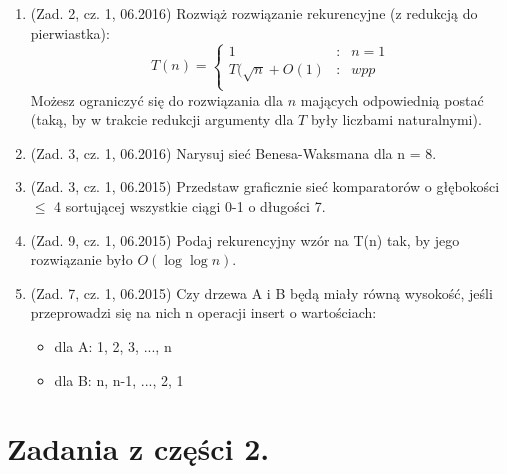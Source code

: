 \documentclass[10pt]{article}%
\begin{document}
\begin{enumerate}


\item (Zad. 2, cz. 1, 06.2016) Rozwiąż rozwiązanie rekurencyjne (z redukcją do pierwiastka):
$$T(n) = \left\{\begin{array}{rcl}
1&:&n=1\\
T(\sqrt{n}+O(1)&:&wpp\\
\end{array} \right.$$
Możesz ograniczyć się do rozwiązania dla $n$ mających odpowiednią postać (taką, by w trakcie redukcji argumenty dla $T$ były liczbami naturalnymi).

\item (Zad. 3, cz. 1, 06.2016) Narysuj sieć Benesa-Waksmana dla n = 8.

\item (Zad. 3, cz. 1, 06.2015) Przedstaw graficznie sieć komparatorów o głębokości $\leq$ 4 sortującej wszystkie ciągi 0-1 o długości 7.

\item (Zad. 9, cz. 1, 06.2015) Podaj rekurencyjny wzór na T(n) tak, by jego rozwiązanie było $O(\log \log n)$.

\item (Zad. 7, cz. 1, 06.2015) Czy drzewa A i B będą miały równą wysokość, jeśli przeprowadzi się na nich n operacji insert o wartościach:
\begin{itemize}
	\item dla A: 1, 2, 3, ..., n 
	\item dla B: n, n-1, ..., 2, 1 
\end{itemize}

\end{enumerate}




\section{Zadania z części 2.}
\end{document}
